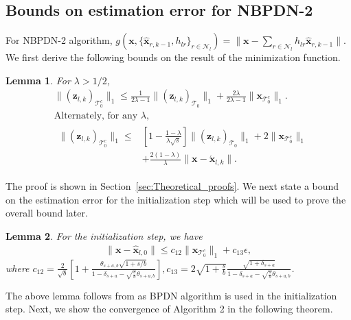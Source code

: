 \documentclass[journal]{IEEEtran}
\newcommand{\mbx}{\mathbf{x}}
\newcommand{\mbz}{\mathbf{z}}
\newcommand{\T}{\mathcal{T}}
\newtheorem{lemma}{Lemma}
\begin{document}
\subsection{Bounds on estimation error for NBPDN-2}
For NBPDN-2 algorithm, $g(\mbx,\{\hat{\mbx}_{r,k-1}, h_{lr}\}_{r \in \mathcal{N}_l}) = \|\mbx-\sum_{r \in \mathcal{N}_l} h_{lr} \hat{\mbx}_{r,k-1}\|$.
We first derive the following bounds on the result of the minimization function. 
\begin{lemma}
\label{lem:inequality_lemma_algo5}
For $\lambda > 1/2$,
\begin{subequations}
    \begin{align}
& \|\left(\mbz_{l,k}\right)_{\T_0^c}\|_1 \leq \frac{1}{2 \lambda -1}\|\left(\mbz_{l,k}\right)_{\T_0}\|_1 + \frac{2\lambda}{2\lambda -1}\|\mbx_{\T_0^c}\|_1. \label{eq:lemma_algo5_1} \\
& \text{Alternately, for any } \lambda, \nonumber \\
& \begin{array}{rl}
\|\left(\mbz_{l,k}\right)_{\T_0^c}\|_1 \leq & \left[1-\frac{1-\lambda}{\lambda \sqrt{s}}\right]\|\left(\mbz_{l,k}\right)_{\T_0}\|_1 + 2\|\mbx_{\T_0^c}\|_1  \\
& + \frac{2(1-\lambda)}{\lambda}\|\mbx  - \acute{\mbx}_{l,k}\|.\label{eq:lemma_algo5_2}
\end{array}
\end{align}
\end{subequations}
\end{lemma}
The proof is shown in Section~\ref{sec:Theoretical_proofs}. We next state a bound on the estimation error for the initialization step which will be used to prove the overall bound later.
\begin{lemma}
\label{lem:BPDN_convergence_result}
For the initialization step, we have 
\begin{eqnarray*}
\|\mbx-\hat{\mbx}_{l,0}\| \leq c_{12} \|\mbx_{\T_0^c}\|_1 + c_{13} \epsilon,
\end{eqnarray*}
where $c_{12} = \frac{2}{\sqrt{b}} \left[1 + \frac{\theta_{s+a,b}\sqrt{1+s/b}}{1-\delta_{s+a}-\sqrt{\frac{s}{b}}\theta_{s+a,b}}\right], c_{13} = 2 \sqrt{1+\frac{s}{b}} \frac{\sqrt{1+\delta_{s+a}}}{1-\delta_{s+a}-\sqrt{\frac{s}{b}}\theta_{s+a,b}} $.
\end{lemma}
The above lemma follows from \cite[Theorem 4]{Cai_Shifting_Inequality_TSP_2010} as BPDN algorithm is used in the initialization step. Next, we show the convergence of Algorithm 2 in the following theorem.
\end{document}
